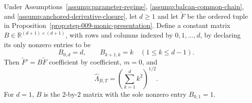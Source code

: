 \begin{lemma} \label{lem:step-009-derivative-shift}
Under Assumptions~\ref{assump:parameter-regime}, \ref{assump:balcan-common-chain}, and \ref{assump:anchored-derivative-closure}, let \(d\geq1\) and let \(\widetilde F\) be the ordered tuple in Proposition~\ref{prop:step-009-monic-presentation}. Define a constant matrix \(B\in\mathbb R^{(d+1)\times(d+1)}\), with rows and columns indexed by \(0,1,\ldots,d\), by declaring its only nonzero entries to be
\begin{equation}
\label{eq:appendix-display-260}
B_{0,d}=d,
\qquad
B_{k+1,k}=k\quad(1\leq k\leq d-1).
\end{equation}
Then \(\widetilde F'=B\widetilde F\) coefficient by coefficient, \(m=0\), and
\begin{equation}
\label{eq:appendix-display-261}
\widehat\Lambda_{B,T}
=\left(\sum_{k=1}^{d}k^2\right)^{1/2}.
\end{equation}
For \(d=1\), \(B\) is the \(2\)-by-\(2\) matrix with the sole nonzero entry \(B_{0,1}=1\).


\end{lemma}

